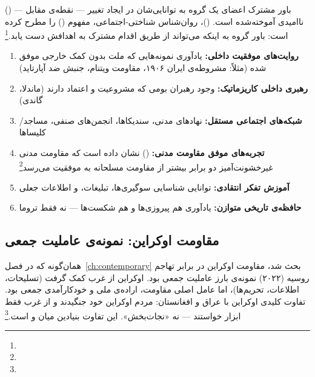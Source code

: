  () — باور مشترک اعضای یک گروه به توانایی‌شان در ایجاد تغییر — نقطه‌ی مقابل ناامیدی آموخته‌شده است.  ()، روان‌شناس شناختی-اجتماعی، مفهوم  () را مطرح کرده است: باور گروه به اینکه می‌تواند از طریق اقدام مشترک به اهدافش دست یابد.\footnote{}

\begin{tcolorbox}[successbox, title={عوامل تقویت عاملیت جمعی (در مقابل نجات‌طلبی)}]
\begin{enumerate}
\item \textbf{روایت‌های موفقیت داخلی:} یادآوری نمونه‌هایی که ملت بدون کمک خارجی موفق شده (مثلاً: مشروطه‌ی ایران ۱۹۰۶، مقاومت ویتنام، جنبش ضد آپارتاید)
\item \textbf{رهبری داخلی کاریزماتیک:} وجود رهبران بومی که مشروعیت و اعتماد دارند (ماندلا، گاندی)
\item \textbf{شبکه‌های اجتماعی مستقل:} نهادهای مدنی، سندیکاها، انجمن‌های صنفی، مساجد/کلیساها
\item \textbf{تجربه‌های موفق مقاومت مدنی:}  () نشان داده است که مقاومت مدنی غیرخشونت‌آمیز دو برابر بیشتر از مقاومت مسلحانه به موفقیت می‌رسد\footnote{}
\item \textbf{آموزش تفکر انتقادی:} توانایی شناسایی سوگیری‌ها، تبلیغات، و اطلاعات جعلی
\item \textbf{حافظه‌ی تاریخی متوازن:} یادآوری هم پیروزی‌ها و هم شکست‌ها — نه فقط تروما
\end{enumerate}
\end{tcolorbox}

\subsection{مقاومت اوکراین: نمونه‌ی عاملیت جمعی}
\label{subsec:ch11-ukraine-agency}

همان‌گونه که در فصل~\ref{ch:contemporary} بحث شد، مقاومت اوکراین در برابر تهاجم روسیه (۲۰۲۲) نمونه‌ی بارز عاملیت جمعی بود. اوکراین از غرب کمک گرفت (تسلیحات، اطلاعات، تحریم‌ها)، اما عامل اصلی مقاومت، اراده‌ی ملی و خودکارآمدی جمعی بود. تفاوت کلیدی اوکراین با عراق و افغانستان: مردم اوکراین خود جنگیدند و از غرب فقط ابزار خواستند — نه «نجات‌بخش». این تفاوت بنیادین میان  و  است.\footnote{}


